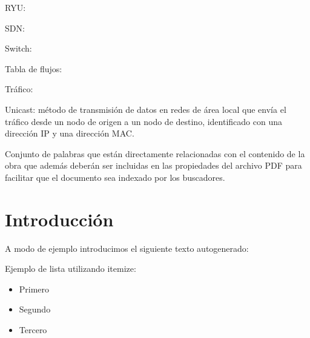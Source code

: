 \documentclass[12pt,a4paper,oneside]{book}
\begin{document}
RYU:

SDN:

Switch: 

Tabla de flujos: 

Tráfico:


Unicast: método de transmisión de datos en redes de área local que envía el tráfico desde un nodo de origen a un nodo de destino, identificado con una dirección IP y una dirección MAC.



\vspace{1cm}

Conjunto de palabras que están directamente relacionadas con el contenido de la obra que además deberán ser incluidas en las
propiedades del archivo PDF para facilitar que el documento sea indexado por los buscadores.


\tableofcontents


\chapter{Introducción} 
\label{intro} %

A modo de ejemplo introducimos el siguiente texto autogenerado:



Ejemplo de lista utilizando itemize:
\begin{itemize}
    \item Primero
    \item Segundo
    \item Tercero\\
\end{itemize}
\end{document}
